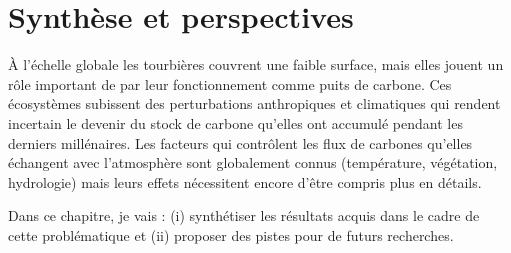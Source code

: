 \chapter*{Synthèse et perspectives}
\newpage




À l'échelle globale les tourbières couvrent une faible surface, mais elles jouent un rôle important de par leur fonctionnement comme puits de carbone.
Ces écosystèmes subissent des perturbations anthropiques et climatiques qui rendent incertain le devenir du stock de carbone qu'elles ont accumulé pendant les derniers millénaires.
Les facteurs qui contrôlent les flux de carbones qu'elles échangent avec l'atmosphère sont globalement connus (température, végétation, hydrologie) mais leurs effets nécessitent encore d'être compris plus en détails.

Dans ce chapitre, je vais : (i) synthétiser les résultats acquis dans le cadre de cette problématique et (ii) proposer des pistes pour de futurs recherches.

